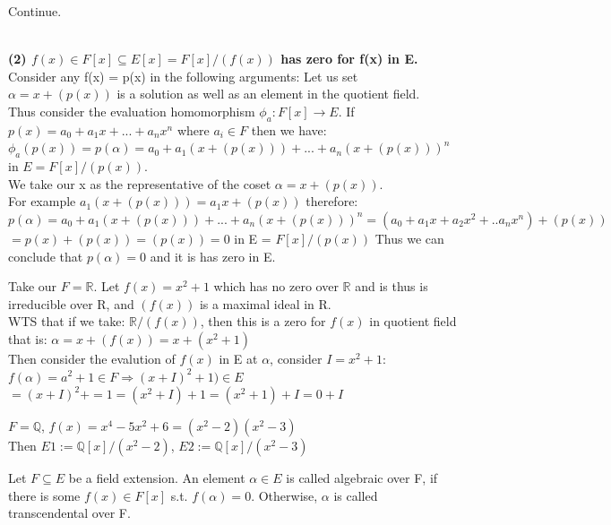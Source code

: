 \documentclass{article}
\newcommand\R{\ensuremath{\mathbb{R}}}
\newcommand\Q{\ensuremath{\mathbb{Q}}}
\begin{document}
\begin{Proof}
    Continue.


 \\\textbf{(2) $f(x) \in F[x] \subseteq E[x]= F[x]/(f(x))$ has zero for f(x) in E.}
 Consider any f(x) = p(x) in the following arguments:
 Let us set $\alpha = x + (p(x))$ is a solution as well as an element in the quotient field.
 \\Thus consider the evaluation homomorphism $\phi_a : F[x] \rightarrow E$. If $p(x) = a_0+a_1x+...+a_nx^n$ where $a_i \in F$ then we have: \\$\phi_a(p(x)) = p(\alpha) = a_0 + a_1(x+(p(x))) +  ... + a_n(x+(p(x)))^n$ in $E = F[x]/ (p(x))$.
 \\We take our x as the representative of the coset $\alpha = x + (p(x))$. 
 \\For example $a_1(x+(p(x))) = a_1x + (p(x))$ therefore:
 \\ $p(\alpha) = a_0 + a_1(x+(p(x))) +  ... + a_n(x+(p(x)))^n = (a_0+ a_1x + a_2x^2 + ..a_nx^n) + (p(x))$ 
 \\$
 = p(x) + (p(x)) = (p(x)) = 0 $ in E = $F[x]/(p(x))$ Thus we can conclude that $p(\alpha) = 0 $ and it is has zero in E.
 
 
\end{Proof}

\begin{Example}
    Take our $F = \R$. Let $f(x)=x^2+1$ which has no zero over $\R$ and is thus is irreducible over R, and $(f(x))$ is a maximal ideal in R. 
    \\WTS that if we take: 
    $\R/(f(x))$, then this is a zero for $f(x)$ in quotient field that is:
    $\alpha = x + (f(x)) = x+ (x^2+1)$
   \\ Then consider the evalution of $f(x)$ in E at $\alpha$, consider $I = x^2 +1$:
   \\ $f(\alpha) = a^2 + 1 \in F \Rightarrow (x+I)^2 + 1)\in E$
   \\ $ = (x+I)^2 + =1 = (x^2 + I) + 1 = (x^2+1) + I  = 0 + I $
\end{Example}

\begin{Example}
    $F = \Q$, $f(x) = x^4 -5x^2 + 6 = (x^2 -2)(x^2 -3)$
    \\ Then $E1:= \Q[x]/(x^2-2)$, 
    $E2:= \Q[x]/(x^2-3)$
\end{Example}
\begin{Def}
    Let $F \subseteq E$ be a field extension. An element $\alpha \in E$ is called algebraic over F, if there is some $f(x) \in F[x]$ s.t. $f(\alpha) = 0$. Otherwise, $\alpha$ is called transcendental over F.  
\end{Def}
\end{document}
